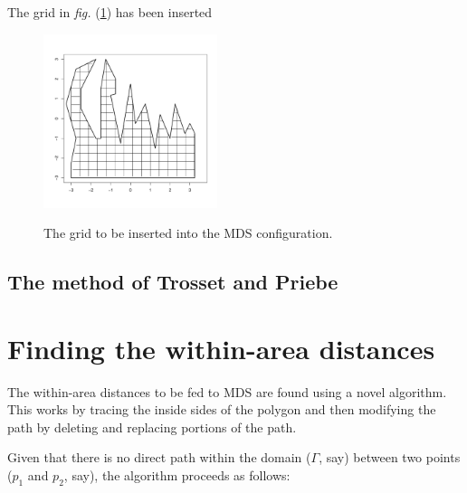 \documentclass[a4paper,10pt]{amsart}
\newcommand{\fig}[1]{\emph{fig.} (\ref{#1})}
\begin{document}
The grid in \fig{} has been inserted 


\begin{figure}
\centering
\includegraphics[width=2in]{figs/wt2-grid-orig.pdf} \\
\caption{The grid to be inserted into the MDS configuration.}
\label{wt2-grid-orig}
\end{figure}



\subsection{The method of Trosset and Priebe}






\section{Finding the within-area distances}

The within-area distances to be fed to MDS are found using a novel algorithm. This works by tracing the inside sides of the polygon and then modifying the path by deleting and replacing portions of the path. 

Given that there is no direct path within the domain ($\Gamma$, say) between two points ($p_1$ and $p_2$, say), the algorithm proceeds as follows:
\end{document}
